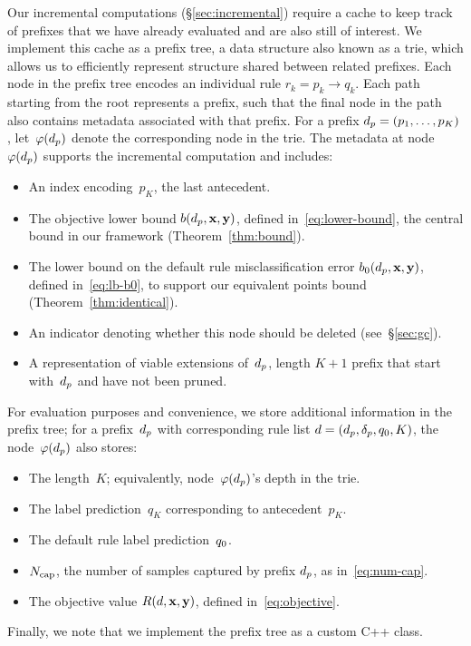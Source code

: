 Our incremental computations (\S\ref{sec:incremental}) require a
cache to keep track of prefixes that we have already evaluated
and are also still of interest.
%
We implement this cache as a prefix tree, a data structure also known as a trie,
which allows us to efficiently represent structure shared between related prefixes.
%
Each node in the prefix tree encodes an individual rule ${r_k = p_k \rightarrow q_k}$.
%
Each path starting from the root represents a prefix, such that the final node
in the path also contains metadata associated with that prefix.
%
For a %
prefix ${d_p = (p_1, \dots, p_K)}$,
let~$\varphi(d_p)$ denote the corresponding node in the trie.
%
The metadata at node~$\varphi(d_p)$ supports the incremental computation
and includes:
\begin{itemize}
\item An index encoding~$p_K$, the last antecedent.
\item The objective lower bound $b(d_p, \mathbf{x}, \mathbf{y})$, defined in~\eqref{eq:lower-bound},
  the central bound in our framework (Theorem~\ref{thm:bound}).
\item The lower bound on the default rule misclassification error
  $b_0(d_p, \mathbf{x}, \mathbf{y})$, defined in~\eqref{eq:lb-b0},
  to support our equivalent points bound (Theorem~\ref{thm:identical}).
\item An indicator denoting whether this node should be deleted (see~\S\ref{sec:gc}).
\item A representation of viable extensions of~$d_p$,
  \ie length ${K+1}$ prefix that start with~$d_p$ and have not been pruned.
\end{itemize}
For evaluation purposes and convenience, we store additional information in
the prefix tree; for a prefix~$d_p$ with corresponding rule list
${{d} = (d_p, \delta_p, q_0, K)}$, the node~$\varphi(d_p)$ also stores:
\begin{itemize}
\item The length~$K$; equivalently, node~$\varphi(d_p)$'s depth in the trie. 
\item The label prediction~$q_K$ corresponding to antecedent~$p_K$.
\item The default rule label prediction~$q_0$.
\item $N_{\textnormal{cap}}$, the number of samples captured by prefix $d_p$, as in~\eqref{eq:num-cap}.
\item The objective value $R({d}, \mathbf{x}, \mathbf{y})$, defined in~\eqref{eq:objective}.
\end{itemize}
%
Finally, we note that we implement the prefix tree as a custom C++ class. %
%
%

